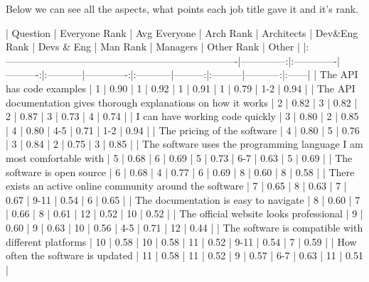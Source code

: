 \documentclass[11pt]{article}
\begin{document}
\begin{multicols}{2}
    Below we can see all the aspects, what points each job title gave it and
    it's rank.

    |                               Question                                | Everyone Rank | Avg Everyone | Arch Rank | Architects | Dev&Eng Rank | Devs & Eng | Man Rank | Managers | Other Rank | Other |
    |:----------------------------------------------------------------------|--------------:|:-------------|----------:|:-----------|-------------:|:-----------|---------:|:---------|-----------:|:------|
    | The API has code examples                                             |             1 | 0.90         |         1 | 0.92       |            1 | 0.91       |        1 | 0.79     |        1-2 | 0.94  |
    | The API documentation gives thorough explanations on how it works     |             2 | 0.82         |         3 | 0.82       |            2 | 0.87       |        3 | 0.73     |          4 | 0.74  |
    | I can have working code quickly                                       |             3 | 0.80         |         2 | 0.85       |            4 | 0.80       |      4-5 | 0.71     |        1-2 | 0.94  |
    | The pricing of the software                                           |             4 | 0.80         |         5 | 0.76       |            3 | 0.84       |        2 | 0.75     |          3 | 0.85  |
    | The software uses the programming language I am most comfortable with |             5 | 0.68         |         6 | 0.69       |            5 | 0.73       |      6-7 | 0.63     |          5 | 0.69  |
    | The software is open source                                           |             6 | 0.68         |         4 | 0.77       |            6 | 0.69       |        8 | 0.60     |          8 | 0.58  |
    | There exists an active online community around the software           |             7 | 0.65         |         8 | 0.63       |            7 | 0.67       |     9-11 | 0.54     |          6 | 0.65  |
    | The documentation is easy to navigate                                 |             8 | 0.60         |         7 | 0.66       |            8 | 0.61       |       12 | 0.52     |         10 | 0.52  |
    | The official website looks professional                               |             9 | 0.60         |         9 | 0.63       |           10 | 0.56       |      4-5 | 0.71     |         12 | 0.44  |
    | The software is compatible with different platforms                   |            10 | 0.58         |        10 | 0.58       |           11 | 0.52       |     9-11 | 0.54     |          7 | 0.59  |
    | How often the software is updated                                     |            11 | 0.58         |        11 | 0.52       |            9 | 0.57       |      6-7 | 0.63     |         11 | 0.51  |

\end{multicols}
\end{document}
